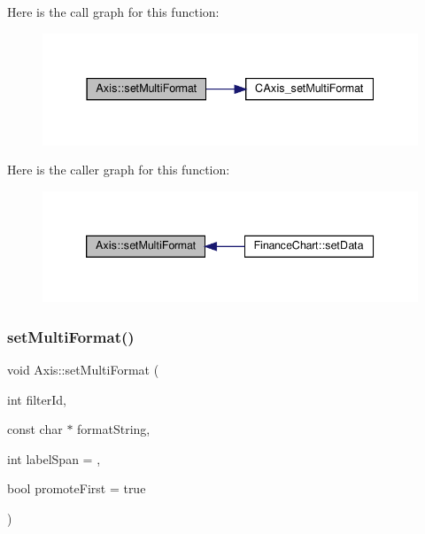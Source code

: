 Here is the call graph for this function\+:
\nopagebreak
\begin{figure}[H]
\begin{center}
\leavevmode
\includegraphics[width=337pt]{class_axis_a3a6ee98f7c5716c8cb94f325aa8a05d6_cgraph}
\end{center}
\end{figure}
Here is the caller graph for this function\+:
\nopagebreak
\begin{figure}[H]
\begin{center}
\leavevmode
\includegraphics[width=339pt]{class_axis_a3a6ee98f7c5716c8cb94f325aa8a05d6_icgraph}
\end{center}
\end{figure}
\mbox{\label{class_axis_aa4b46e028226064bcc5f720ba04a9e08}} 
\subsubsection{\texorpdfstring{set\+Multi\+Format()}{setMultiFormat()}\hspace{0.1cm}{\footnotesize\ttfamily [2/2]}}
{\footnotesize\ttfamily void Axis\+::set\+Multi\+Format (\begin{DoxyParamCaption}\item[{int}]{filter\+Id,  }\item[{const char $\ast$}]{format\+String,  }\item[{int}]{label\+Span = {},  }\item[{bool}]{promote\+First = {\ttfamily true} }\end{DoxyParamCaption})\hspace{0.3cm}{\ttfamily [inline]}}



